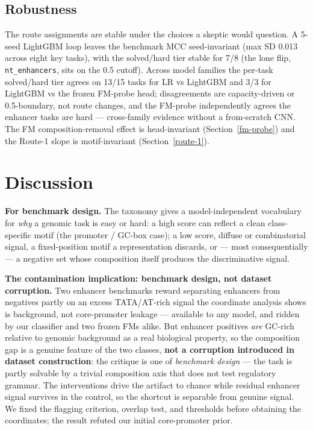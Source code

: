 \documentclass{ws-procs11x85}
\begin{document}
\subsection{Robustness}\label{robustness}

The route assignments are stable under the choices a skeptic would question. A 5-seed LightGBM loop leaves
the benchmark MCC seed-invariant (max SD 0.013 across eight key tasks), with the solved/hard tier stable
for 7/8 (the lone flip, \texttt{nt\_enhancers}, sits on the 0.5 cutoff). Across model families the per-task
solved/hard tier agrees on 13/15 tasks for LR vs LightGBM and 3/3 for LightGBM vs the frozen FM-probe head;
disagreements are capacity-driven or 0.5-boundary, not route changes, and the FM-probe independently agrees
the enhancer tasks are hard --- cross-family evidence without a from-scratch CNN. The FM composition-removal effect is head-invariant (Section~\ref{fm-probe}) and the
Route-1 slope is motif-invariant (Section~\ref{route-1}).

\section{Discussion}\label{discussion}

\textbf{For benchmark design.} The taxonomy gives a model-independent vocabulary for \emph{why} a genomic
task is easy or hard: a high score can reflect a clean class-specific motif (the promoter / GC-box case);
a low score, diffuse or combinatorial signal, a fixed-position motif a representation discards, or ---
most consequentially --- a negative set whose composition itself produces the discriminative signal.

\textbf{The contamination implication: benchmark design, not dataset corruption.} Two enhancer benchmarks
reward separating enhancers from negatives partly on an excess TATA/AT-rich signal the coordinate analysis
shows is background, not core-promoter leakage --- available to any model, and ridden by our classifier and
two frozen FMs alike. But enhancer positives \emph{are} GC-rich relative to genomic background as a real
biological property, so the composition gap is a genuine feature of the two classes, \textbf{not a
corruption introduced in dataset construction}: the critique is one of \emph{benchmark design} --- the task
is partly solvable by a trivial composition axis that does not test regulatory grammar. The interventions
drive the artifact to chance while residual enhancer signal survives in the control, so the shortcut is
separable from genuine signal. We fixed the flagging criterion, overlap test, and thresholds before
obtaining the coordinates; the result refuted our initial core-promoter prior.
\end{document}
